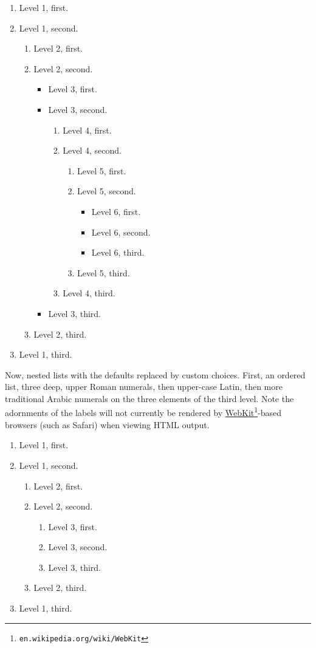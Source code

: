\documentclass[pdflatex]{sn-jnl}
\theoremstyle{thmstyleone}%
\theoremstyle{thmstyletwo}%
\theoremstyle{thmstylethree}%
\numberwithin{equation}{section}
\begin{document}
\begin{enumerate}
\item{}Level 1, first.%
\item{}Level 1, second.%
\begin{enumerate}
\item{}Level 2, first.%
\item{}Level 2, second.%
\begin{itemize}[label=\textbullet]
\item{}Level 3, first.%
\item{}Level 3, second.%
\begin{enumerate}
\item{}Level 4, first.%
\item{}Level 4, second.%
\begin{enumerate}
\item{}Level 5, first.%
\item{}Level 5, second.%
\begin{itemize}[label=$\circ$]
\item{}Level 6, first.%
\item{}Level 6, second.%
\item{}Level 6, third.%
\end{itemize}
%
\item{}Level 5, third.%
\end{enumerate}
%
\item{}Level 4, third.%
\end{enumerate}
%
\item{}Level 3, third.%
\end{itemize}
%
\item{}Level 2, third.%
\end{enumerate}
%
\item{}Level 1, third.%
\end{enumerate}
%
\par
Now, nested lists with the defaults replaced by custom choices.  First, an ordered list, three deep, upper Roman numerals, then upper-case Latin, then more traditional Arabic numerals on the three elements of the third level.  Note the adornments of the labels will not currently be rendered by \href{https://en.wikipedia.org/wiki/WebKit}{WebKit}\footnote{\nolinkurl{en.wikipedia.org/wiki/WebKit}\label{section-lists-2-13-2}}-based browsers (such as Safari) when viewing HTML output.%
\begin{enumerate}[label={*\Roman**}]
\item{}Level 1, first.%
\item{}Level 1, second.%
\begin{enumerate}[label={++\Alph*}]
\item{}Level 2, first.%
\item{}Level 2, second.%
\begin{enumerate}[label={\arabic*)}]
\item{}Level 3, first.%
\item{}Level 3, second.%
\item{}Level 3, third.%
\end{enumerate}
%
\item{}Level 2, third.%
\end{enumerate}
%
\item{}Level 1, third.%
\end{enumerate}
\end{document}
